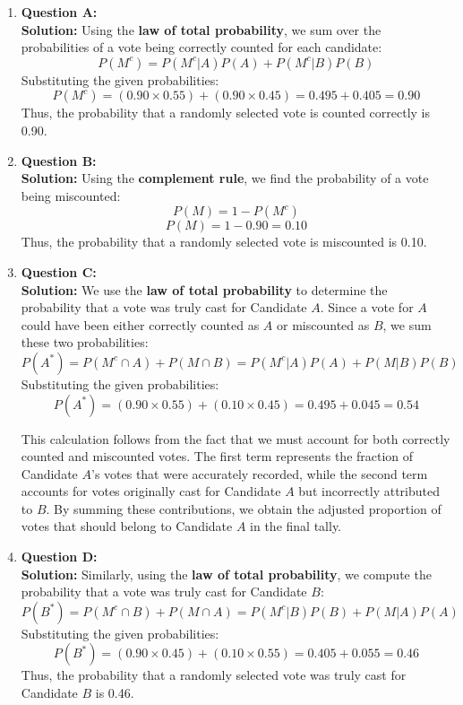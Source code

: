 \documentclass{article}
\begin{document}
\begin{enumerate}

    \item \textbf{Question A:} \\
    \textbf{Solution:} Using the \textbf{law of total probability}, we sum over the probabilities of a vote being correctly counted for each candidate:
    \[
    P(M^c) = P(M^c | A) P(A) + P(M^c | B) P(B)
    \]
    Substituting the given probabilities:
    \[
    P(M^c) = (0.90 \times 0.55) + (0.90 \times 0.45) = 0.495 + 0.405 = 0.90
    \]
    Thus, the probability that a randomly selected vote is counted correctly is 0.90.

    \item \textbf{Question B:} \\
    \textbf{Solution:} Using the \textbf{complement rule}, we find the probability of a vote being miscounted:
    \[
    P(M) = 1 - P(M^c)
    \]
    \[
    P(M) = 1 - 0.90 = 0.10
    \]
    Thus, the probability that a randomly selected vote is miscounted is 0.10.
    
    \item \textbf{Question C:} \\
    \textbf{Solution:} We use the \textbf{law of total probability} to determine the probability that a vote was truly cast for Candidate \( A \). Since a vote for \( A \) could have been either correctly counted as \( A \) or miscounted as \( B \), we sum these two probabilities:
    \[
    P(A^*) =  P(M^c \cap A) + P(M \cap B) = P(M^c | A) P(A) + P(M | B) P(B)
    \]
    Substituting the given probabilities:
    \[
    P(A^*) = (0.90 \times 0.55) + (0.10 \times 0.45) = 0.495 + 0.045 = 0.54
    \]
    
    This calculation follows from the fact that we must account for both correctly counted and miscounted votes. The first term represents the fraction of Candidate \( A \)'s votes that were accurately recorded, while the second term accounts for votes originally cast for Candidate \( A \) but incorrectly attributed to \( B \). By summing these contributions, we obtain the adjusted proportion of votes that should belong to Candidate \( A \) in the final tally.
    

    \item \textbf{Question D:} \\
    \textbf{Solution:} Similarly, using the \textbf{law of total probability}, we compute the probability that a vote was truly cast for Candidate \( B \):
    \[
    P(B^*) = P(M^c \cap B) + P(M \cap A) = P(M^c | B) P(B) + P(M | A) P(A)
    \]
    Substituting the given probabilities:
    \[
    P(B^*) = (0.90 \times 0.45) + (0.10 \times 0.55) = 0.405 + 0.055 = 0.46
    \]
    Thus, the probability that a randomly selected vote was truly cast for Candidate \( B \) is 0.46.


\end{enumerate}
\end{document}
